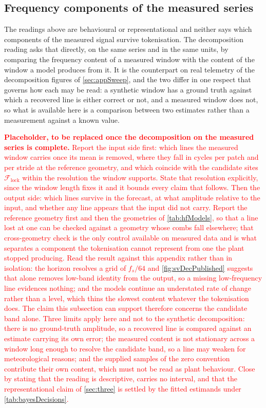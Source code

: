 \subsection{Frequency components of the measured series}

The readings above are behavioural or representational and neither says which components of the measured signal survive tokenisation. The decomposition reading asks that directly, on the same series and in the same units, by comparing the frequency content of a measured window with the content of the window a model produces from it. It is the counterpart on real telemetry of the decomposition figures of \autoref{sec:appSweep}, and the two differ in one respect that governs how each may be read: a synthetic window has a ground truth against which a recovered line is either correct or not, and a measured window does not, so what is available here is a comparison between two estimates rather than a measurement against a known value.

\textcolor{red}{\textbf{Placeholder, to be replaced once the decomposition on the measured series is complete.} Report the input side first: which lines the measured window carries once its mean is removed, where they fall in cycles per patch and per stride at the reference geometry, and which coincide with the candidate sites $\mathcal F_{\mathrm{lock}}$ within the resolution the window supports. State that resolution explicitly, since the window length fixes it and it bounds every claim that follows. Then the output side: which lines survive in the forecast, at what amplitude relative to the input, and whether any line appears that the input did not carry. Report the reference geometry first and then the geometries of \autoref{tab:hfModels}, so that a line lost at one can be checked against a geometry whose combs fall elsewhere; that cross-geometry check is the only control available on measured data and is what separates a component the tokenisation cannot represent from one the plant stopped producing. Read the result against this appendix rather than in isolation: the horizon resolves a grid of $f_s/64$ and \autoref{fig:svDecPublished} suggests that alone removes low-band identity from the output, so a missing low-frequency line evidences nothing; and the models continue an understated rate of change rather than a level, which thins the slowest content whatever the tokenisation does. The claim this subsection can support therefore concerns the candidate band alone. Three limits apply here and not to the synthetic decomposition: there is no ground-truth amplitude, so a recovered line is compared against an estimate carrying its own error; the measured content is not stationary across a window long enough to resolve the candidate band, so a line may weaken for meteorological reasons; and the supplied samples of the zero convention contribute their own content, which must not be read as plant behaviour. Close by stating that the reading is descriptive, carries no interval, and that the representational claim of \autoref{sec:three} is settled by the fitted estimands under \autoref{tab:bayesDecisions}.}
